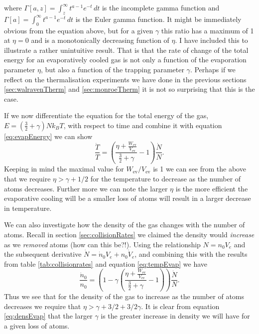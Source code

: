 where $\Gamma\left[a,z\right] = \int_z^\infty t^{a-1}e^{-t}\,dt$ is the incomplete gamma function and $\Gamma\left[a\right] = \int_0^\infty t^{a-1}e^{-t}\,dt$ is the Euler gamma function.
It might be immediately obvious from the equation above, but for a given $\gamma$ this ratio has a maximum of 1 at $\eta=0$ and is a monotonically decreasing function of $\eta$.
I have included this to illustrate a rather unintuitive result.
That is that the rate of change of the total energy for an evaporatively cooled gas is not only a function of the evaporation parameter $\eta$, but also a function of the trapping parameter $\gamma$.
Perhaps if we reflect on the thermalisation experiments we have done in the previous sections \ref{sec:walravenTherm} and \ref{sec:monroeTherm} it is not so surprising that this is the case.

If we now differentiate the equation for the total energy of the gas, $E=\left(\frac{3}{2} + \gamma\right)Nk_BT$, with respect to time and combine it with equation \eqref{eq:evapEnergy} we can show
\begin{equation}
    \frac{\dot{T}}{T} = \left(\frac{\eta + \frac{W_\mathrm{ev}}{V_\mathrm{ev}}}{\frac{3}{2}+\gamma}-1\right) \frac{\dot{N}}{N}. \label{eq:tempEvap}
\end{equation}
Keeping in mind the maximal value for $W_\mathrm{ev} / V_\mathrm{ev}$ is 1 we can see from the above that we require $\eta > \gamma + 1/2$ for the temperature to decrease as the number of atoms decreases. 
Further more we can note the larger $\eta$ is the more efficient the evaporative cooling will be \ie a smaller loss of atoms will result in a larger decrease in temperature.

We can also investigate how the density of the gas changes with the number of atoms.
Recall in section \ref{sec:collisionRates} we claimed the density would \emph{increase} as we \emph{removed} atoms (how can this be?!).
Using the relationship $N=n_0V_e$ and the subsequent derivative $\dot{N} = \dot{n}_0V_e + n_0\dot{V}_e$, and combining this with the results from table \ref{tab:collisionrates} and equation \eqref{eq:tempEvap} we have
\begin{equation}
    \frac{\dot{n}_0}{n_0} = \left(1-\gamma\left(\frac{\eta + \frac{W_\mathrm{ev}}{V_\mathrm{ev}}}{\frac{3}{2}+\gamma}-1\right)\right) \frac{\dot{N}}{N}. \label{eq:densEvap}
\end{equation}
Thus we see that for the density of the gas to increase as the number of atoms decreases we require that $\eta > \gamma + 3/2 + 3/2\gamma$. 
It is clear from equation \eqref{eq:densEvap} that the larger $\gamma$ is the greater increase in density we will have for a given loss of atoms.

